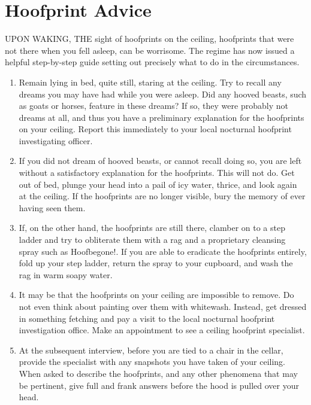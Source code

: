 \chapter{Hoofprint Advice}



UPON WAKING, THE sight of hoofprints on the ceiling, hoofprints that were not there when you fell asleep, can be worrisome. The regime has now issued a helpful step-by-step guide setting out precisely what to do in the circumstances.

\begin{enumerate}[i]
\item Remain lying in bed, quite still, staring at the ceiling. Try to recall any dreams you may have had while you were asleep. Did any hooved beasts, such as goats or horses, feature in these dreams? If so, they were probably not dreams at all, and thus you have a preliminary explanation for the hoofprints on your ceiling. Report this immediately to your local nocturnal hoofprint investigating officer.

\item If you did not dream of hooved beasts, or cannot recall doing so, you are left without a satisfactory explanation for the hoofprints. This will not do. Get out of bed, plunge your head into a pail of icy water, thrice, and look again at the ceiling. If the hoofprints are no longer visible, bury the memory of ever having seen them.

\item If, on the other hand, the hoofprints are still there, clamber on to a step ladder and try to obliterate them with a rag and a proprietary cleansing spray such as Hoofbegone!. If you are able to eradicate the hoofprints entirely, fold up your step ladder, return the spray to your cupboard, and wash the rag in warm soapy water.

\item It may be that the hoofprints on your ceiling are impossible to remove. Do not even think about painting over them with whitewash. Instead, get dressed in something fetching and pay a visit to the local nocturnal hoofprint investigation office. Make an appointment to see a ceiling hoofprint specialist.

\item At the subsequent interview, before you are tied to a chair in the cellar, provide the specialist with any snapshots you have taken of your ceiling. When asked to describe the hoofprints, and any other phenomena that may be pertinent, give full and frank answers before the hood is pulled over your head.


\end{enumerate}
